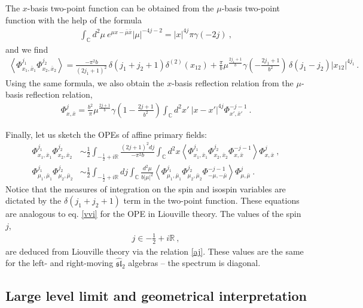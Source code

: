 \documentclass[12pt,a4paper,notitlepage]{report}
\numberwithin{equation}{section}
\theoremstyle{break}
\begin{document}
The $x$-basis two-point function can be obtained from the $\mu$-basis two-point function with the help of the formula 
\begin{align}
 \int_{{\mathbb{C}}}d^2\mu\ e^{\mu x-\bar{\mu}\bar{x}} |\mu|^{-4j-2} = |x|^{4j}\pi \gamma(-2j) \ ,
\end{align}
and we find 
\begin{align}
 \left\langle \Phi^{j_1}_{x_1,\bar{x}_1} \Phi^{j_2}_{x_2,\bar{x}_2} \right\rangle = \frac{-\pi^2 b}{(2j_1+1)^2}\, \delta(j_1+j_2+1)\delta^{(2)}(x_{12}) 
+ \frac{\pi}{b}\mu^{\frac{2j_1+1}{b}} \gamma(-\tfrac{2j_1+1}{b^2})\, \delta(j_1-j_2)|x_{12}|^{4j_1}\, .
\label{pjpj}
\end{align}
Using the same formula, we also obtain the $x$-basis reflection relation from the $\mu$-basis reflection relation,
\begin{align}
 \Phi^j_{x,\bar{x}} = \frac{b^2}{\pi}\mu^{\frac{2j+1}{b}}\gamma(1-\tfrac{2j+1}{b^2})\int_{{\mathbb{C}}}d^2x'\ |x-x'|^{4j}\Phi^{-j-1}_{x',\bar{x}'}\ .
\end{align}

Finally, let us sketch the OPEs of affine primary fields:
\begin{align}
 \Phi^{j_1}_{x_1,\bar{x}_1}\Phi^{j_2}_{x_2,\bar{x}_2} &\sim \frac12 \int_{-\frac12 + i\mathbb{R}} \frac{(2j+1)^2 dj}{-\pi^2b}\int_{{\mathbb{C}}}d^2x \left\langle \Phi^{j_1}_{x_1,\bar{x}_1}\Phi^{j_2}_{x_2,\bar{x}_2} \Phi^{-j-1}_{x,\bar{x}} \right\rangle \Phi^j_{x,\bar{x}}\ ,
\label{xope}
\\
\Phi^{j_1}_{\mu_1,\bar{\mu}_1}\Phi^{j_2}_{\mu_2,\bar{\mu}_2} &\sim \frac12 \int_{-\frac12 + i\mathbb{R}} dj\int_{{\mathbb{C}}}\frac{d^2\mu}{b|\mu|^2} \left\langle \Phi^{j_1}_{\mu_1,\bar{\mu}_1}\Phi^{j_2}_{\mu_2,\bar{\mu}_2} \Phi^{-j-1}_{-\mu,-\bar{\mu}} \right\rangle \Phi^j_{\mu,\bar{\mu}}\ .
\label{mope}
\end{align}
Notice that the measures of integration on the spin and isospin variables are dictated by the $\delta(j_1+j_2+1)$ term in the two-point function.
These equations are analogous to eq. \eqref{vvi} for the OPE in Liouville theory.
The values of the spin $j$,
\begin{align}
 \boxed{j\in -\frac12 + i\mathbb{R}}\ , 
\end{align}
 are deduced from Liouville theory via the relation \eqref{aj}.
These values are the same for the left- and right-moving $\widehat{\mathfrak{sl}}_2$ algebras -- the spectrum is diagonal.


\subsection{Large level limit and geometrical interpretation}
\end{document}

